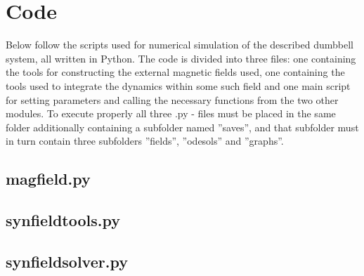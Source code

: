 \documentclass[main.tex]{subfiles}
\begin{document}
\section{Code}\label{app:scripts}
Below follow the scripts used for numerical simulation of the described dumbbell system,
all written in Python.
The code is divided into three files: one containing the tools for constructing the
external magnetic fields used, one containing the tools used to integrate the dynamics
within some such field and one main script for setting parameters and calling the necessary
functions from the two other modules. To execute properly all three .py - files must be
placed in the same folder additionally containing a subfolder named ''saves'', and that
subfolder must in turn contain three subfolders ''fields'', ''odesols'' and ''graphs''.

\subsection{magfield.py}


\subsection{synfieldtools.py}


\subsection{synfieldsolver.py}

\end{document}
